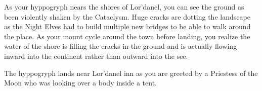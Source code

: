 
As your hyppogryph nears the shores of Lor'danel, you can see the ground as been violently shaken by the Cataclysm. Huge cracks are dotting the landscape as the Night Elves had to build multiple new bridges to be able to walk around the place. As your mount cycle around the town before landing, you realize the water of the shore is filling the cracks in the ground and is actually flowing inward into the continent rather than outward into the see.

The hyppogryph lands near Lor'danel inn as you are greeted by a Priestess of the Moon who was looking over a body inside a tent.


